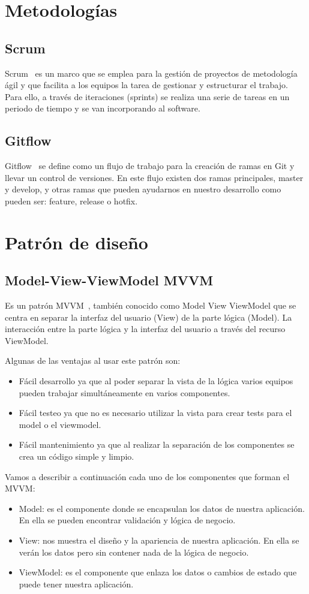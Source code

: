 \section{Metodologías}
\subsection{Scrum}
Scrum~\cite{wiki:scrum} es un marco que se emplea para la gestión de proyectos de metodología ágil y que facilita a los equipos la tarea de gestionar y estructurar el trabajo. Para ello, a través de iteraciones (sprints) se realiza una serie de tareas en un periodo de tiempo y se van incorporando al software.
\subsection{Gitflow}
Gitflow~\cite{gitflow} se define como un flujo de trabajo para la creación de ramas en Git y llevar un control de versiones. En este flujo existen dos ramas principales, master y develop, y otras ramas que pueden ayudarnos en nuestro desarrollo como pueden ser: feature, release o  hotfix.
\section{Patrón de diseño}
\subsection{Model-View-ViewModel MVVM}
Es un patrón MVVM~\cite{mvvm}, también conocido como Model View ViewModel que se centra en separar la interfaz del usuario (View) de la parte lógica (Model). La interacción entre la parte lógica y la interfaz del usuario a través del recurso ViewModel.

Algunas de las ventajas al usar este patrón son:
\begin{itemize}
\item Fácil desarrollo ya que al poder separar la vista de la lógica varios equipos pueden trabajar simultáneamente en varios componentes.
\item Fácil testeo ya que no es necesario utilizar la vista para crear tests para el model o el viewmodel.
\item Fácil mantenimiento ya que al realizar la separación de los componentes se crea un código simple y limpio.
\end{itemize}

Vamos a describir a continuación cada uno de los componentes que forman el MVVM:
\begin{itemize}
	\item Model: es el componente donde se encapsulan los datos de nuestra aplicación. En ella se pueden encontrar validación y lógica de negocio.
	\item View: nos muestra el diseño y la apariencia de nuestra aplicación. En ella se verán los datos pero sin contener nada de la lógica de negocio.
	\item ViewModel: es el componente que enlaza los datos o cambios de estado que puede tener nuestra aplicación.
\end{itemize}

